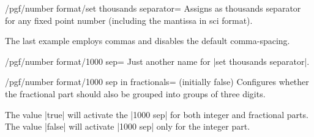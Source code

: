 \documentclass[a4paper]{ltxdoc}
\begin{document}
\begin{key}{/pgf/number format/set thousands separator=}
    Assigns  as thousands separator for any fixed point number
    (including the mantissa in sci format).
\begin{codeexample}[]
\end{codeexample}

\begin{codeexample}[]
\end{codeexample}

\begin{codeexample}[]
\end{codeexample}

\begin{codeexample}[]
\end{codeexample}

\begin{codeexample}[]
\end{codeexample}
    The last example employs commas and disables the default comma-spacing.
\end{key}

\begin{key}{/pgf/number format/1000 sep=}
    Just another name for |set thousands separator|.
\end{key}

\begin{key}{/pgf/number format/1000 sep in fractionals= (initially false)}
    Configures whether the fractional part should also be grouped into groups
    of three digits.

    The value |true| will activate the |1000 sep| for both integer and
    fractional parts. The value |false| will activate |1000 sep| only for the
    integer part.
\begin{codeexample}[]
\end{codeexample}

\begin{codeexample}[]
\end{codeexample}
\end{key}
\end{document}

